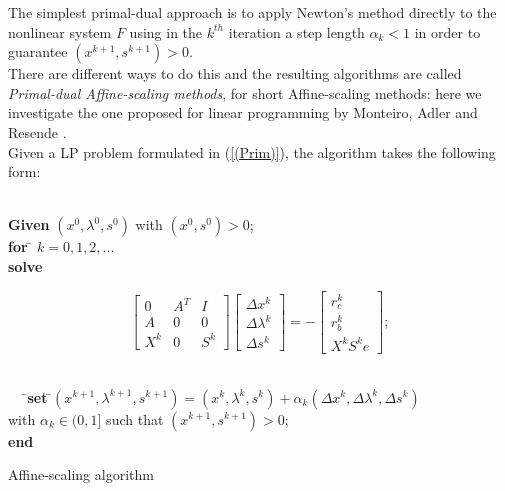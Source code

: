 \documentclass[a4paper,10 pt,titlepage,twoside]{report}
\theoremstyle{plain}
\theoremstyle{definition}
\theoremstyle{remark}
\begin{document}
The simplest primal-dual approach is to apply Newton's method directly to the nonlinear system $F$ using in the $k^{th}$ iteration a step length $\alpha_{k}<1$ in order to guarantee $(x^{k+1},s^{k+1})>0$.\\ There are different ways to do this and the resulting algorithms are called \textit{Primal-dual Affine-scaling methods}, for short Affine-scaling methods: here we investigate the one proposed for linear programming by Monteiro,
Adler and Resende \cite{MARE}.\\ 
Given a LP problem formulated in (\ref{(Prim)}), the algorithm takes the following form:\\
\begin{algorithm}[H]\label{algaff}
\begin{tabbing}
	\\
	\textbf{Given} $(x^{0}, \lambda^{0}, s^{0})$ with $(x^{0}, s^{0})>0$;\\
	\textbf{for} \= $k = 0, 1, 2,...$ \\
	\> \textbf{solve}
	\end{tabbing}
\begin{equation}\label{mtx:aff}\tag{4.2b}	
\begin{bmatrix}
0&A^{T}&I \\A& 0&0\\X^{k}&0&S^{k}
\end{bmatrix}\begin{bmatrix}
\Delta x^{k}\\\Delta\lambda^{k} \\\Delta s^{k}
\end{bmatrix}=-\begin{bmatrix}
r_{c}^{k}\\r_{b}^{k}\\X^{k}S^{k}e
\end{bmatrix};
\end{equation}
\begin{tabbing}
	\\$\;\;\;\;\;$\=
	\>\textbf{set} \=$(x^{k+1}, \lambda^{k+1}, s^{k+1}) = (x^{k}, \lambda^{k}, s^{k})+ \alpha_{k}(\Delta x^{k}, \Delta\lambda^{k}, \Delta s^{k})$
	\\
	\>\> with $\alpha_{k}\in(0,1]$ such that $(x^{k+1}, s^{k+1})>0$; \\
	\textbf{end}
\end{tabbing}
\caption{\label{alg:AS}Affine-scaling algorithm}
\end{algorithm}
\end{document}
